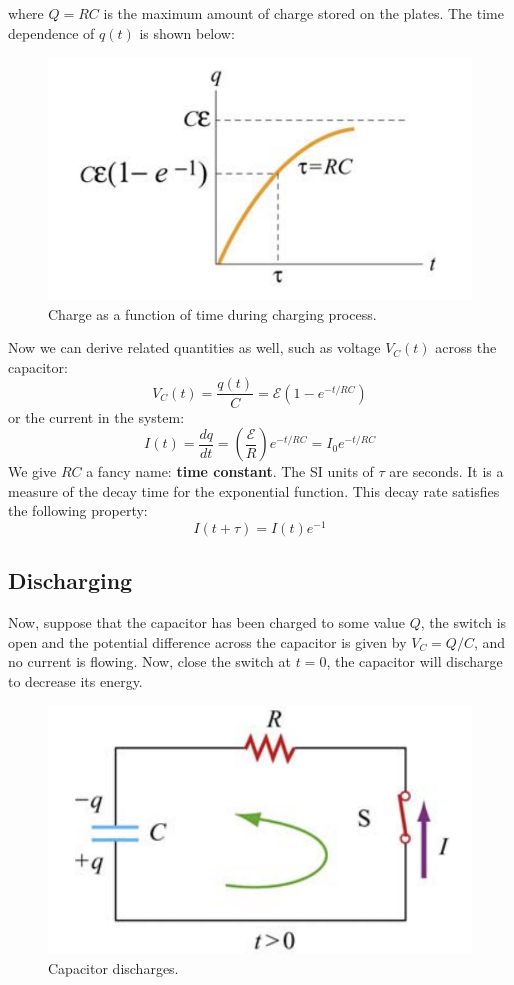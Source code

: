 \documentclass[11pt, letterpaper]{article}
\begin{document}
where $Q = RC$ is the maximum amount of charge stored on the plates. The time dependence of $q(t)$ is shown below:\newpage
\begin{figure}[h!]
	\centering
	\includegraphics[scale=0.4]{charge-graph}
	\caption{Charge as a function of time during charging process.}
	\label{fig:charging}
\end{figure}

Now we can derive related quantities as well, such as voltage $V_C(t)$ across the capacitor: \[V_C(t) = \frac{q(t)}{C} = \mathcal{E}(1 - e^{-t/RC})\] or the current in the system: \[I(t) = \frac{dq}{dt} = \left(\frac{\mathcal{E}}{R}\right)e^{-t/RC} = I_0e^{-t/RC}\] We give $RC$ a fancy name: \textbf{time constant}. The SI units of $\tau$ are seconds. It is a measure of the decay time for the exponential function. This decay rate satisfies the following property: \[I(t+\tau) = I(t)e^{-1}\]

\subsection{Discharging}
Now, suppose that the capacitor has been charged to some value $Q$, the switch is open and the potential difference across the capacitor is given by $V_C = Q/C$, and no current is flowing. Now, close the switch at $t = 0$, the capacitor will discharge to decrease its energy.
\begin{figure}[h!]
	\centering
	\includegraphics[scale=0.5]{discharge}
	\caption{Capacitor discharges.}
	\label{fig:discharge}
\end{figure}
\end{document}
